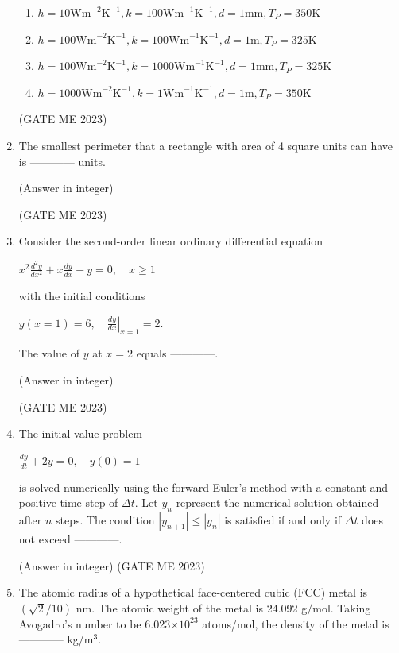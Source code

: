 \documentclass[journal]{IEEEtran}
\begin{document}
\begin{enumerate}
\begin{enumerate}
    \item $ h = 10  \text{Wm}^{-2}\text{K}^{-1}, k = 100  \text{Wm}^{-1}\text{K}^{-1}, d = 1  \text{mm}, T_P = 350  \text{K} $
    \item $ h = 100  \text{Wm}^{-2}\text{K}^{-1}, k = 100  \text{Wm}^{-1}\text{K}^{-1}, d = 1  \text{m}, T_P = 325  \text{K} $
    \item $ h = 100  \text{Wm}^{-2}\text{K}^{-1}, k = 1000  \text{Wm}^{-1}\text{K}^{-1}, d = 1  \text{mm}, T_P = 325  \text{K} $
    \item $ h = 1000  \text{Wm}^{-2}\text{K}^{-1}, k = 1  \text{Wm}^{-1}\text{K}^{-1}, d = 1  \text{m}, T_P = 350  \text{K} $
\end{enumerate}
\hfill (GATE ME 2023)

\item The smallest perimeter that a rectangle with area of 4 square units can have is ------------ units. 

(Answer in integer)

\hfill (GATE ME 2023)

\item Consider the second-order linear ordinary differential equation
\begin{center}
$ x^2 \frac{d^2 y}{dx^2} + x \frac{dy}{dx} - y = 0, \quad x \geq 1 $
\end{center}
with the initial conditions
\begin{center}
$ y(x = 1) = 6, \quad \left. \frac{dy}{dx} \right|_{x=1} = 2. $
\end{center}
The value of $ y $ at $ x = 2 $ equals ------------. 

(Answer in integer)

\hfill (GATE ME 2023)

\item The initial value problem 
\begin{center}
$ \frac{dy}{dt} + 2y = 0, \quad y(0) = 1 $
\end{center}
is solved numerically using the forward Euler’s method with a constant and positive time step of $\Delta t$. Let $y_n$ represent the numerical solution obtained after $n$ steps. The condition $|y_{n+1}| \leq |y_n|$ is satisfied if and only if $\Delta t$ does not exceed ------------. 

(Answer in integer)
\hfill (GATE ME 2023)

\item The atomic radius of a hypothetical face-centered cubic (FCC) metal is $(\sqrt{2}/10)$ nm. The atomic weight of the metal is 24.092 g/mol. Taking Avogadro’s number to be 6.023$\times 10^{23}$ atoms/mol, the density of the metal is ------------ kg/m$^3$. 


\end{enumerate}
\end{document}
